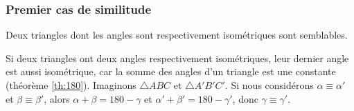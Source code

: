 \documentclass[a4paper,12pt]{article}
\begin{document}
\subsubsection{Premier cas de similitude}
\begin{theorem}
Deux triangles dont les angles sont respectivement isométriques sont semblables.
\end{theorem}

\begin{remark}
Si deux triangles ont deux angles respectivement isométriques, leur dernier angle est aussi isométrique, car la somme des angles d'un triangle est une constante (théorème \ref{th:180}). Imaginons $\triangle ABC$ et $\triangle A'B'C'$. Si nous considérons $\alpha \equiv \alpha'$ et $\beta \equiv \beta'$, alors $\alpha + \beta = 180 - \gamma$ et $\alpha' + \beta' = 180 - \gamma'$, donc $\gamma \equiv \gamma'$.

\end{remark}
\end{document}
